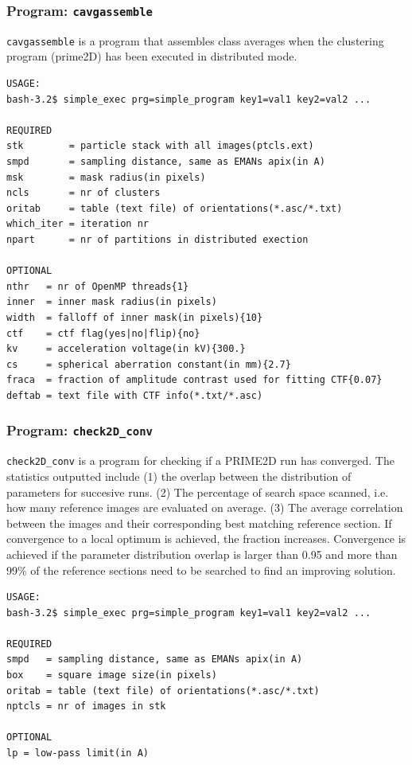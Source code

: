 \documentclass[a4paper,11pt]{article}
\newcommand{\prgname}[1]{\textcolor{NavyBlue}{\texttt{#1}}}
\begin{document}
\subsubsection{Program: \prgname{cavgassemble}}
\label{cavgassemble}
\prgname{cavgassemble} is a program that assembles class averages when the clustering program (prime2D) has been executed in distributed mode.

\begin{verbatim}
USAGE:
bash-3.2$ simple_exec prg=simple_program key1=val1 key2=val2 ...

REQUIRED
stk        = particle stack with all images(ptcls.ext)
smpd       = sampling distance, same as EMANs apix(in A)
msk        = mask radius(in pixels)
ncls       = nr of clusters
oritab     = table (text file) of orientations(*.asc/*.txt)
which_iter = iteration nr
npart      = nr of partitions in distributed exection

OPTIONAL
nthr   = nr of OpenMP threads{1}
inner  = inner mask radius(in pixels)
width  = falloff of inner mask(in pixels){10}
ctf    = ctf flag(yes|no|flip){no}
kv     = acceleration voltage(in kV){300.}
cs     = spherical aberration constant(in mm){2.7}
fraca  = fraction of amplitude contrast used for fitting CTF{0.07}
deftab = text file with CTF info(*.txt/*.asc)
\end{verbatim}

\subsubsection{Program: \prgname{check2D\_conv}}
\label{check2D_conv}
\prgname{check2D\_conv} is a program for checking if a PRIME2D run has converged. The statistics outputted include (1) the overlap between the distribution of parameters for succesive runs. (2) The percentage of search space scanned, i.e. how many reference images are evaluated on average. (3) The average correlation between the images and their corresponding best matching reference section. If convergence to a local optimum is achieved, the fraction increases. Convergence is achieved if the parameter distribution overlap is larger than 0.95 and more than 99\% of the reference sections need to be searched to find an improving solution.

\begin{verbatim}
USAGE:
bash-3.2$ simple_exec prg=simple_program key1=val1 key2=val2 ...

REQUIRED
smpd   = sampling distance, same as EMANs apix(in A)
box    = square image size(in pixels)
oritab = table (text file) of orientations(*.asc/*.txt)
nptcls = nr of images in stk

OPTIONAL
lp = low-pass limit(in A)
\end{verbatim}
\end{document}
